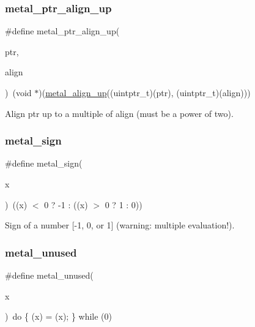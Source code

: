 \subsubsection{\texorpdfstring{metal\+\_\+ptr\+\_\+align\+\_\+up}{metal\_ptr\_align\_up}}
{\footnotesize\ttfamily \#define metal\+\_\+ptr\+\_\+align\+\_\+up(\begin{DoxyParamCaption}\item[{}]{ptr,  }\item[{}]{align }\end{DoxyParamCaption})~(void $\ast$)(\hyperlink{group__utilities_ga416a17445a84ce264d90616960082f51}{metal\+\_\+align\+\_\+up}((uintptr\+\_\+t)(ptr), (uintptr\+\_\+t)(align)))}

Align \textquotesingle{}ptr\textquotesingle{} up to a multiple of \textquotesingle{}align\textquotesingle{} (must be a power of two). \mbox{\label{group__utilities_ga7648611485a94eb9594ab64645052cda}} 
\subsubsection{\texorpdfstring{metal\+\_\+sign}{metal\_sign}}
{\footnotesize\ttfamily \#define metal\+\_\+sign(\begin{DoxyParamCaption}\item[{}]{x }\end{DoxyParamCaption})~((x) $<$ 0 ? -\/1 \+: ((x) $>$ 0 ? 1 \+: 0))}

Sign of a number \mbox{[}-\/1, 0, or 1\mbox{]} (warning\+: multiple evaluation!). \mbox{\label{group__utilities_ga731379b7002ae0ebd74eefe656064f2a}} 
\subsubsection{\texorpdfstring{metal\+\_\+unused}{metal\_unused}}
{\footnotesize\ttfamily \#define metal\+\_\+unused(\begin{DoxyParamCaption}\item[{}]{x }\end{DoxyParamCaption})~do \{ (x) = (x); \} while (0)}

